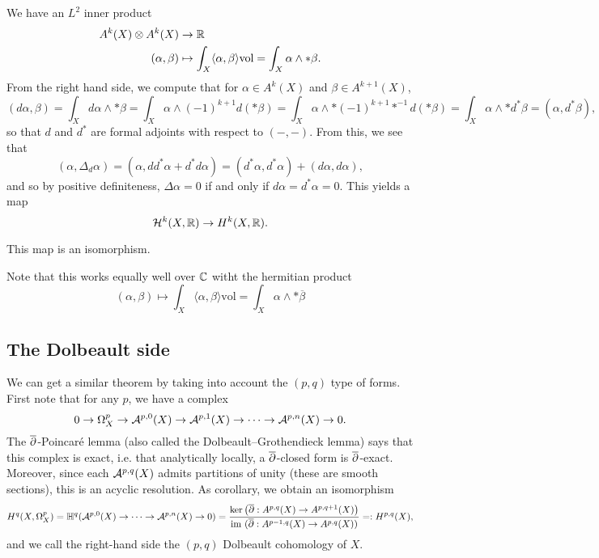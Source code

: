 	We have an $L^2$ inner product
	\begin{align*}
		A^k(X)\otimes A^k(X)&\to \mathbb R\\
		(\alpha,\beta)&\mapsto\int_X\langle \alpha,\beta\rangle\text{vol}=\int_X\alpha\wedge *\beta.
	\end{align*}
	From the right hand side, we compute that for $\alpha\in A^k(X)$ and $\beta\in A^{k+1}(X)$,
	\begin{equation*}
		(d\alpha,\beta)=\int_Xd\alpha\wedge *\beta=\int_X\alpha\wedge (-1)^{k+1}d(*\beta)=\int_X\alpha\wedge * (-1)^{k+1} *^{-1}d(*\beta)=\int_X\alpha\wedge *d^*\beta=(\alpha,d^*\beta),
	\end{equation*}
	so that $d$ and $d^*$ are formal adjoints with respect to $(-,-)$. From this, we see that 
	\[
	(\alpha,\Delta_d\alpha)=(\alpha,dd^*\alpha+d^*d\alpha)=(d^*\alpha,d^*\alpha)+(d\alpha,d\alpha),
	\]
	and so by positive definiteness, $\Delta\alpha=0$ if and only if $d\alpha=d^*\alpha=0$. This yields a map 
	\[
	\mathcal{H}^k(X,\mathbb R)\to H^k(X,\mathbb R).
	\]
	\begin{theorem}
This map is an isomorphism.
	\end{theorem}
%
\begin{remark}
	Note that this works equally well over $\mathbb C$ witht the hermitian product
	\[
	(\alpha,\beta)\mapsto\int_X\langle\alpha,\beta\rangle \text{vol}=\int_X\alpha\wedge *\overline\beta
	\]
\end{remark}
	
\subsection{The Dolbeault side}
We can get a similar theorem by taking into account the $(p,q)$ type of forms.  First note that for any $p$,  we have a complex
\[
0\to \Omega_X^p\to \mathcal{A}^{p,0}(X)\to \mathcal{A}^{p,1}(X)\to\cdots\to\mathcal{A}^{p,n}(X)\to 0.
\]	
%
The ${\overline\partial}$-Poincaré lemma (also called the Dolbeault--Grothendieck lemma) says that this complex is exact, i.e. that analytically locally, a ${\overline\partial}$-closed form is ${\overline\partial}$-exact. Moreover, since each $\mathcal{A}^{p,q}(X)$ admits partitions of unity (these are smooth sections), this is an acyclic resolution. As corollary, we obtain an isomorphism
\begin{equation}
H^q(X,\Omega_X^p)=\mathbb{H}^q(\mathcal{A}^{p,0}(X)\to\cdots\to \mathcal{A}^{p,n}(X)\to 0)=\frac{\ker\left({\overline\partial}:A^{p,q}(X)\to A^{p,q+1}(X)\right)}{\text{im }({\overline\partial}:A^{p-1,q}(X)\to A^{p,q}(X))}=:H^{p,q}(X),\label{eq:dol}
\end{equation}
and we call the right-hand side the $(p,q)$ Dolbeault cohomology of $X$.


